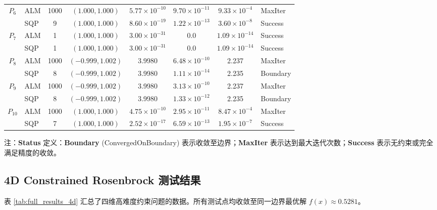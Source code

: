 \documentclass[a4paper,12pt]{article}
\begin{document}
\begin{table}[H]
\begin{tabular}{clc c ccc l}
        \multirow{2}{*}{$P_6$} 
        & ALM & 1000 & $(1.000, 1.000)$ & $5.77 \times 10^{-10}$ & $9.70 \times 10^{-11}$ & $9.33 \times 10^{-4}$ & MaxIter \\
        & SQP & 9    & $(1.000, 1.000)$ & $8.60 \times 10^{-19}$ & $1.22 \times 10^{-13}$ & $3.60 \times 10^{-8}$ & Success \\ \cmidrule{1-8}

        \multirow{2}{*}{$P_7$} 
        & ALM & 1    & $(1.000, 1.000)$ & $3.00 \times 10^{-31}$ & 0.0 & $1.09 \times 10^{-14}$ & Success \\
        & SQP & 1    & $(1.000, 1.000)$ & $3.00 \times 10^{-31}$ & 0.0 & $1.09 \times 10^{-14}$ & Success \\ \cmidrule{1-8}

        \multirow{2}{*}{$P_8$} 
        & ALM & 1000 & $(-0.999, 1.002)$ & 3.9980 & $6.48 \times 10^{-10}$ & 2.237 & MaxIter \\
        & SQP & 8    & $(-0.999, 1.002)$ & 3.9980 & $1.11 \times 10^{-14}$ & 2.235 & Boundary \\ \cmidrule{1-8}

        \multirow{2}{*}{$P_9$} 
        & ALM & 1000 & $(-0.999, 1.002)$ & 3.9980 & $3.13 \times 10^{-10}$ & 2.237 & MaxIter \\
        & SQP & 8    & $(-0.999, 1.002)$ & 3.9980 & $1.33 \times 10^{-12}$ & 2.235 & Boundary \\ \cmidrule{1-8}

        \multirow{2}{*}{$P_{10}$} 
        & ALM & 1000 & $(1.000, 1.000)$ & $4.75 \times 10^{-10}$ & $2.95 \times 10^{-11}$ & $8.47 \times 10^{-4}$ & MaxIter \\
        & SQP & 7    & $(1.000, 1.000)$ & $2.52 \times 10^{-17}$ & $6.59 \times 10^{-13}$ & $1.95 \times 10^{-7}$ & Success \\
        \bottomrule
    \end{tabular}

     {\footnotesize \begin{flushleft}
    注：\textbf{Status} 定义：\textbf{Boundary} (ConvergedOnBoundary) 表示收敛至边界；\textbf{MaxIter} 表示达到最大迭代次数；\textbf{Success} 表示无约束或完全满足精度的收敛。
    \end{flushleft}}
\end{table}


\subsection{4D Constrained Rosenbrock 测试结果}
表 \ref{tab:full_results_4d} 汇总了四维高难度约束问题的数据。所有测试点均收敛至同一边界最优解 $f(x) \approx 0.5281$。
\end{document}
